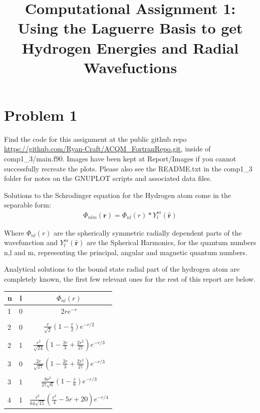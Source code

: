 \documentclass{article}
\renewcommand{\vec}[1]{\mathbf{#1}}
\let\oldhat\hat
\renewcommand{\hat}[1]{\oldhat{\mathbf{#1}}}
\begin{document}
\noindent
	\title{Computational Assignment 1: Using the Laguerre Basis to get Hydrogen Energies and Radial Wavefuctions}
    \maketitle 
    
    \section{Problem 1}
    Find the code for this assignment at the public github repo \url{https://github.com/Ryan-Craft/ACQM_FortranRepo.git}, inside of comp1\_3/main.f90. 
    Images have been kept at Report/Images if you cannot successfully recreate the plots. Please also see the README.txt in the comp1\_3 folder for notes on the GNUPLOT scripts and associated data files. 
    \label{problem 1}
    
    Solutions to the Schrodinger equation for the Hydrogen atom come in the separable form:
    \begin{gather}
    	\Phi_{nlm}(\vec{r}) =  \Phi_{nl}(r)*Y_{l}^m(\hat{\vec{r}})
    \end{gather}
    
    Where $\Phi_{nl}(r)$ are the spherically symmetric radially dependent parts of the wavefunction and $Y_{l}^m(\hat{\vec{r}})$ are the Spherical Harmonics, for the quantum numbers n,l and m, representing the principal, angular and magnetic quantum numbers. 
    
    Analytical solutions to the bound state radial part of the hydrogen atom are completely known, the first few relevant ones for the rest of this report are below.
    \large
    \begin{center}
    	\begin{tabular}{lcc}\toprule
    		n & l & $\Phi_{nl}(r)$ \\ \bottomrule
    		1 & 0  &   $2re^{-r}$          \\
    		&&\\
    		2 & 0  & $\frac{r}{\sqrt{2}}(1-\frac{r}{2})e^{-r/2} $  \\
    		&&\\
    		2 & 1  & $ \frac{r^2}{\sqrt{24}}(1-\frac{2r}{3} + \frac{2r^2}{27})e^{-r/3}  $  \\
    		&&\\
    		3 & 0  & $\frac{2r}{\sqrt{27}}(1-\frac{2r}{3}+\frac{2r^2}{27})e^{-r/3}$   \\
    		&&\\
    		3 & 1  & $\frac{8r^2}{27\sqrt{6}}(1-\frac{r}{6})e^{-r/3}$ \\ 
    		&&\\
    		4 & 1  & $\frac{r^2}{64\sqrt{15}}(\frac{r^2}{4}-5r+20)e^{-r/4}$ \\ \bottomrule
    	\end{tabular}
    \end{center}
    \normalsize
    
\end{document}
